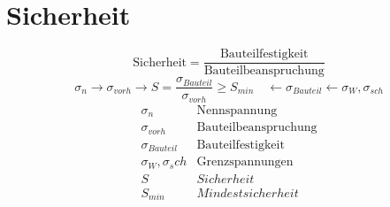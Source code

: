 



\section{Sicherheit}
\[ \text{Sicherheit} = \frac{\text{Bauteilfestigkeit}}{\text{Bauteilbeanspruchung}} \]
\[ \sigma_n  \rightarrow \sigma_{vorh} \rightarrow 
S = \frac{\sigma_{Bauteil}}{\sigma_{vorh}} \geq S_{min}
\quad \leftarrow \sigma_{Bauteil} \leftarrow \sigma_W, \sigma_{sch} \]
\[ \begin{array}{ll}
\sigma_n & \text{Nennspannung}\\
\sigma_{vorh} & \text{Bauteilbeanspruchung}\\
\sigma_{Bauteil} & \text{Bauteilfestigkeit}\\
\sigma_W, \sigma_sch & \text{Grenzspannungen}\\
S & Sicherheit\\
S_{min} & Mindestsicherheit
\end{array} \]

